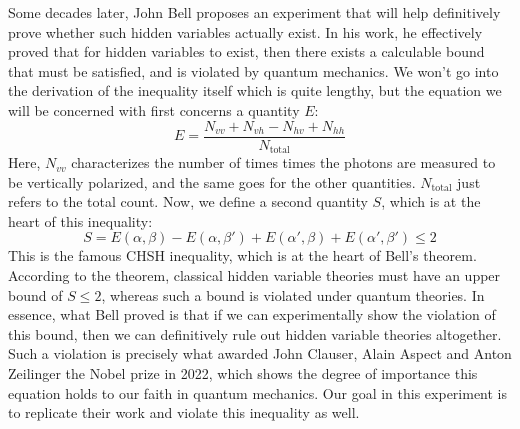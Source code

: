 \documentclass[10pt]{article}
\begin{document}
	Some decades later, John Bell proposes an experiment that will help definitively prove whether such
	hidden variables actually exist. In his work, he effectively proved that for hidden variables to exist,
	then there exists a calculable bound that must be satisfied, and is violated by quantum mechanics. We
	won't go into the derivation of the inequality itself which is quite lengthy, but the equation we will be
	concerned with first concerns a quantity \( E \):
	\[
		E = \frac{N_{vv} + N_{vh} - N_{hv} + N_{hh}}{N_{\text{total}}}
	\]
	Here, \( N_{vv} \) characterizes the number of times times the photons are measured to be vertically
	polarized, and the same goes for the other quantities. \( N_\text{total} \) just refers to the total
	count. Now, we define a second quantity \( S \), which is at the heart of this inequality:
	\begin{equation}
		\label{CHSH}
		S = E(\alpha, \beta) - E(\alpha, \beta') + E(\alpha', \beta) + E(\alpha', \beta') \leq 2
	\end{equation}
	This is the famous CHSH inequality, which is at the heart of Bell's theorem. According to the theorem,
	classical hidden variable theories must have an upper bound of \( S \leq 2 \), whereas such a bound is
	violated under quantum theories. In essence, what Bell proved is that if we can experimentally show the
	violation of this bound, then we can definitively rule out hidden variable theories altogether. Such a
	violation is precisely what awarded John Clauser, Alain Aspect and Anton Zeilinger the Nobel prize in
	2022, which shows the degree of importance this equation holds to our faith in quantum mechanics. Our goal
	in this experiment is to replicate their work and violate this inequality as well.
\end{document}
